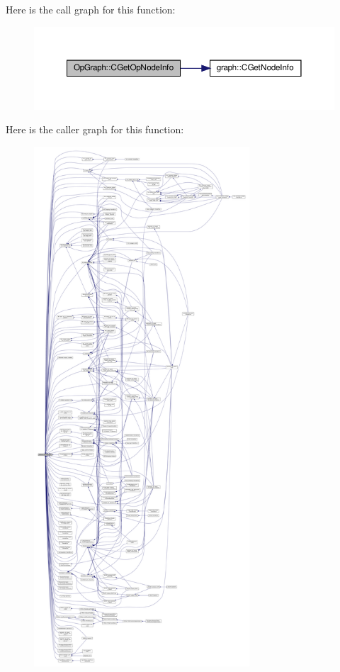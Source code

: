 Here is the call graph for this function\+:
\nopagebreak
\begin{figure}[H]
\begin{center}
\leavevmode
\includegraphics[width=350pt]{d6/d79/structOpGraph_a8743b659d48a1922e75397b47c97bd5c_cgraph}
\end{center}
\end{figure}
Here is the caller graph for this function\+:
\nopagebreak
\begin{figure}[H]
\begin{center}
\leavevmode
\includegraphics[height=550pt]{d6/d79/structOpGraph_a8743b659d48a1922e75397b47c97bd5c_icgraph}
\end{center}
\end{figure}
\mbox{\label{structOpGraph_a515cdea7270316a2dcaabecaab6e4994}} 
